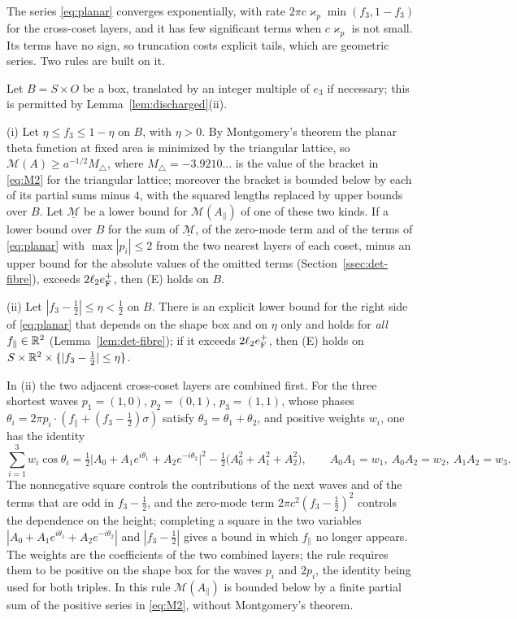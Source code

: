 The series \eqref{eq:planar} converges exponentially, with rate $2\pi c\varkappa_p\min(f_3,1-f_3)$ for the cross-coset layers, and it
has few significant terms when $c\varkappa_p$ is not small. Its terms have no sign, so truncation costs explicit tails, which are
geometric series. Two rules are built on it.

\begin{lemma}\label{lem:planarrules}
Let $B=S\times O$ be a box, translated by an integer multiple of $e_3$ if necessary; this is permitted by
Lemma~\ref{lem:discharged}\textup{(ii)}.

\textup{(i)} Let $\eta\le f_3\le1-\eta$ on $B$, with $\eta>0$. By Montgomery's theorem \cite{Montgomery1988} the planar theta function
at fixed area is minimized by the triangular lattice, so $\mathcal M(A)\ge a^{-1/2}M_\triangle$, where $M_\triangle=-3.9210\ldots$ is
the value of the bracket in \eqref{eq:M2} for the triangular lattice; moreover the bracket is bounded below by each of its partial
sums minus $4$, with the squared lengths replaced by upper bounds over $B$. Let $\underline{\mathcal M}$ be a lower bound for
$\mathcal M(A_\parallel)$ of one of these two kinds. If a lower bound over $B$ for the sum of $\underline{\mathcal M}$, of the
zero-mode term and of the terms of \eqref{eq:planar} with $\max|p_i|\le2$ from the two nearest layers of each coset, minus an upper
bound for the absolute values of the omitted terms \textup{(}Section~\ref{ssec:det-fibre}\textup{)}, exceeds $2\ell_2e_{\mathrm F}^+$, then
\textup{(E)} holds on $B$.

\textup{(ii)} Let $|f_3-\frac12|\le\eta<\frac12$ on $B$. There is an explicit lower bound for the right side of \eqref{eq:planar} that
depends on the shape box and on $\eta$ only and holds for \emph{all} $f_\parallel\in\mathbb R^2$
(Lemma~\ref{lem:det-fibre}); if it exceeds $2\ell_2e_{\mathrm F}^+$, then \textup{(E)} holds on $S\times\mathbb R^2\times\{|f_3-\frac12|\le\eta\}$.
\end{lemma}

In (ii) the two adjacent cross-coset layers are combined first. For the three shortest waves $p_1=(1,0)$, $p_2=(0,1)$,
$p_3=(1,1)$, whose phases $\theta_i=2\pi p_i\cdot(f_\parallel+(f_3-\frac12)\sigma)$ satisfy $\theta_3=\theta_1+\theta_2$, and positive
weights $w_i$, one has the identity
\[
  \sum_{i=1}^3w_i\cos\theta_i=\tfrac12\bigl|A_0+A_1e^{i\theta_1}+A_2e^{-i\theta_2}\bigr|^2-\tfrac12\bigl(A_0^2+A_1^2+A_2^2\bigr),
  \qquad A_0A_1=w_1,\ A_0A_2=w_2,\ A_1A_2=w_3 .
\]
The nonnegative square controls the contributions of the next waves and of the terms that are odd in $f_3-\frac12$, and the zero-mode
term $2\pi c^2(f_3-\frac12)^2$ controls the dependence on the height; completing a square in the two variables
$|A_0+A_1e^{i\theta_1}+A_2e^{-i\theta_2}|$ and $|f_3-\frac12|$ gives a bound in which $f_\parallel$ no longer appears. The weights
are the coefficients of the two combined layers; the rule requires them to be positive on the shape box for the waves $p_i$ and
$2p_i$, the identity being used for both triples. In this rule $\mathcal M(A_\parallel)$ is bounded below by a finite partial sum of
the positive series in \eqref{eq:M2}, without Montgomery's theorem.

